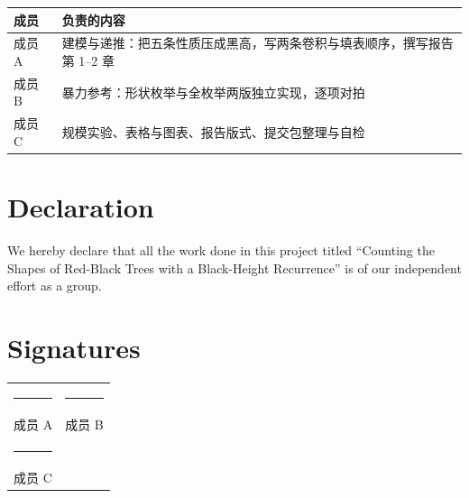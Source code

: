\documentclass[12pt,a4paper,fontset=windows]{ctexart}
\begin{document}
\begin{center}
\small
\begin{tabular}{p{2.6cm}p{10.4cm}}
\toprule
\rowcolor{gray!12}成员 & 负责的内容 \\
\midrule
成员 A & 建模与递推：把五条性质压成黑高，写两条卷积与填表顺序，撰写报告第 1--2 章 \\
成员 B & 暴力参考：形状枚举与全枚举两版独立实现，逐项对拍 \\
成员 C & 规模实验、表格与图表、报告版式、提交包整理与自检 \\
\bottomrule
\end{tabular}
\end{center}

\vspace{2.2em}

\section*{Declaration}

We hereby declare that all the work done in this project titled ``Counting the Shapes of Red-Black Trees with a Black-Height Recurrence'' is of our independent effort as a group.

\vspace{2.2em}

\section*{Signatures}

\vspace{1.2em}
\begin{center}
\begin{tabular}{p{5.2cm}p{5.2cm}}
\rule{5.2cm}{0.4pt} & \rule{5.2cm}{0.4pt} \\
成员 A & 成员 B \\[2.6em]
\rule{5.2cm}{0.4pt} & \\
成员 C & \\
\end{tabular}
\end{center}
\end{document}
